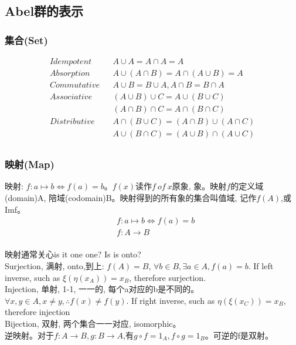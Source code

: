 \documentclass[UTF8]{../../09-Mathematics}
\begin{document}
\subsection{Abel群的表示}


\subsubsection{集合(Set)}
\begin{equation}
  \begin{aligned}
  Idempotent & & A \cup A = A \cap A = A \\
  Absorption & &A \cup (A \cap B) = A \cap (A \cup B) = A\\
  Commutative & &A \cup B = B \cup A, A \cap B = B \cap A\\
  Associative & &(A \cup B) \cup C = A \cup (B \cup C)\\
              & &(A \cap B) \cap C = A \cap (B \cap C)\\
  Distributive & &A \cap (B \cup C) = (A \cap B) \cup (A \cap C)\\
                & &A \cup (B \cap C) = (A \cup B) \cap (A \cup C)\\
  \end{aligned}
\end{equation}




\subsubsection{映射(Map)}
映射: $f:a \mapsto b \Leftrightarrow f(a)=b$。$f(x)读作f \ of \ x$原象, 象。映射$f$的定义域(domain)A, 陪域(codomain)B。映射得到的所有象的集合叫值域, 记作$f(A)$,或Imf。
\begin{equation}
  \begin{split}
  &f:a \mapsto b \Leftrightarrow f(a)=b\\
  &f: A \to B\\
  \end{split}
\end{equation}

映射通常关心is it one one? Is is onto? \\
Surjection, 满射, onto,到上: $f(A)=B$, $\forall b \in B, \exists a \in A, f(a) = b$. If left inverse, such as $\xi (\eta (x_A)) = x_B$, therefore surjection.\\
Injection, 单射, 1-1, 一一的, 每个a对应的b是不同的。$\forall x, y \in A, x \neq y, \therefore f(x) \neq f(y)$. If right inverse, such as $ \eta (\xi (x_C)) = x_B$, therefore injection\\
Bijection, 双射, 两个集合一一对应, isomorphic。\\
逆映射。对于$f:A \to B, g: B \to A$,有$g \circ f =1_A, f \circ g =1_B$。可逆的f是双射。\\
\end{document}
